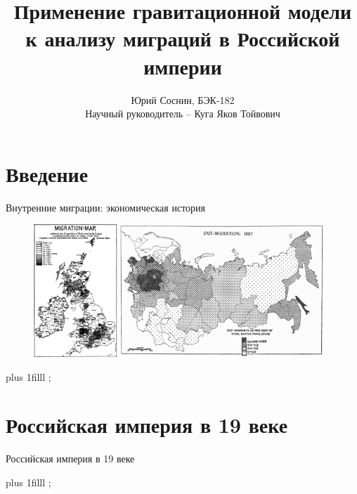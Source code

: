 \documentclass[aspectratio=169]{beamer}
\title{Применение гравитационной модели к анализу миграций в Российской империи}
\author{Юрий Соснин, БЭК-182\\Научный руководитель -- Куга Яков Тойвович}
\institute{Высшая Школа Экономики\\Санкт-Петербургская Школа Экономики и Менеджмента}
\date{\mydate}
\newcommand{\btVFill}{\vskip0pt plus 1filll}
\begin{document}
\begin{frame}
  \titlepage
\end{frame}


\section{Введение}
\begin{frame}{Внутренние миграции: экономическая история}

\begin{figure}
    \includegraphics[width=0.28\textwidth]{britain.png}
    \includegraphics[width=0.68\textwidth]{russia.png}
\end{figure}

\btVFill
\cite{ravenstein_laws_1885}; \cite{leasure_internal_1968}
\bigskip

\end{frame}

\section{Российская империя в 19 веке}
\begin{frame}{Российская империя в 19 веке}

\scalebox{0.9}{}

\btVFill
\cite{gregory_russian_1983}; \cite{maddison_project_2018}
\bigskip

\end{frame}
\end{document}
